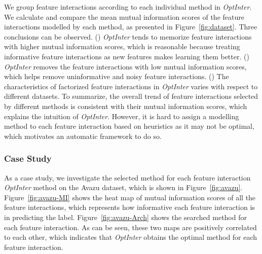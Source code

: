 \documentclass[conference]{IEEEtran}
\begin{document}
We group feature interactions according to each individual method in \textit{OptInter}. We calculate and compare the mean mutual information scores of the feature interactions modelled by each method, as presented in Figure~\ref{fig:dataset}. Three conclusions can be observed. () \textit{OptInter} tends to memorize feature interactions with higher mutual information scores, which is reasonable because treating informative feature interactions as new features makes learning them better. () \textit{OptInter} removes the feature interactions with low mutual information scores, which helps remove uninformative and noisy feature interactions. () The characteristics of factorized feature interactions in \textit{OptInter} varies with respect to different datasets. 
To summarize, the overall trend of feature interactions selected by different methods is consistent with their mutual information scores, which explains the intuition of \textit{OptInter}. However, it is hard to assign a modelling method to each feature interaction based on heuristics as it may not be optimal, which motivates an automatic framework to do so.

\subsubsection{Case Study}
\label{sec:case_study}

\begin{figure*}[!htbp]
\centering
{}
\caption{An example of interpretability on Avazu Dataset. }
\label{fig:avazu} 
\end{figure*}

As a case study, we investigate the selected method for each feature interaction \textit{OptInter} method on the Avazu dataset, which is shown in Figure~\ref{fig:avazu}.  Figure~\ref{fig:avazu-MI} shows the heat map of mutual information scores of all the feature interactions, which represents how informative each feature interaction is in predicting the label. Figure~\ref{fig:avazu-Arch} shows the searched method for each feature interaction. As can be seen, these two maps are positively correlated to each other, which indicates that \textit{OptInter} obtains the optimal method for each feature interaction.
\end{document}
